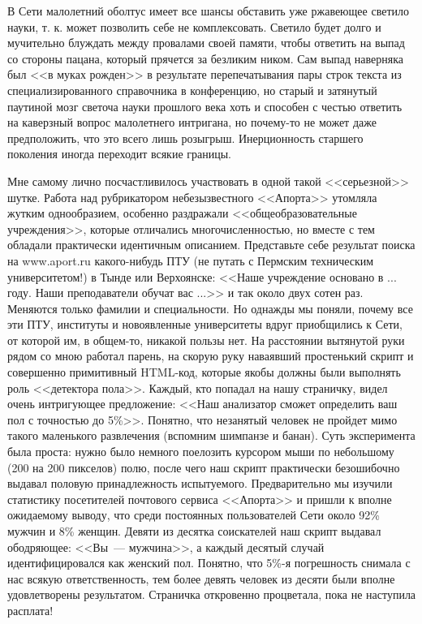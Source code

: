 \documentclass{scrbook}
\newcommand{\flqq}{<<}
\newcommand{\frqq}{>>}
\newcommand{\mdash}{~--- }
\begin{document}
В Сети малолетний оболтус имеет все шансы обставить уже ржавеющее светило науки, т. к. может позволить себе не комплексовать. Светило будет долго и мучительно блуждать между провалами своей памяти, чтобы ответить на выпад со стороны пацана, который прячется за безликим ником. Сам выпад наверняка был {\flqq}в муках рожден{\frqq} в результате перепечатывания пары строк текста из специализированного справочника в конференцию, но старый и затянутый паутиной мозг светоча науки прошлого века хоть и способен с честью ответить на каверзный вопрос малолетнего интригана, но почему-то не может даже предположить, что это всего лишь розыгрыш. Инерционность старшего поколения иногда переходит всякие границы.

Мне самому лично посчастливилось участвовать в одной такой {\flqq}серьезной{\frqq} шутке. Работа над рубрикатором небезызвестного {\flqq}Апорта{\frqq} утомляла жутким однообразием, особенно раздражали {\flqq}общеобразовательные учреждения{\frqq}, которые отличались многочисленностью, но вместе с тем обладали практически идентичным описанием. Представьте себе результат поиска на www.aport.ru какого-нибудь ПТУ (не путать с Пермским техническим университетом!) в Тынде или Верхоянске: {\flqq}Наше учреждение основано в ... году. Наши преподаватели обучат вас ...{\frqq} и так около двух сотен раз. Меняются только фамилии и специальности. Но однажды мы поняли, почему все эти ПТУ, институты и новоявленные университеты вдруг приобщились к Сети, от которой им, в общем-то, никакой пользы нет. На расстоянии вытянутой руки рядом со мною работал парень, на скорую руку наваявший простенький скрипт и совершенно примитивный HTML-код, которые якобы должны были выполнять роль {\flqq}детектора пола{\frqq}. Каждый, кто попадал на нашу страничку, видел очень интригующее предложение: {\flqq}Наш анализатор сможет определить ваш пол с точностью до 5\%{\frqq}. Понятно, что незанятый человек не пройдет мимо такого маленького развлечения (вспомним шимпанзе и банан). Суть эксперимента была проста: нужно было немного поелозить курсором мыши по небольшому (200 на 200 пикселов) полю, после чего наш скрипт практически безошибочно выдавал половую принадлежность испытуемого. Предварительно мы изучили статистику посетителей почтового сервиса {\flqq}Апорта{\frqq} и пришли к вполне ожидаемому выводу, что среди постоянных пользователей Сети около 92\% мужчин и 8\% женщин. Девяти из десятка соискателей наш скрипт выдавал ободряющее: {\flqq}Вы{\mdash}мужчина{\frqq}, а каждый десятый случай идентифицировался как женский пол. Понятно, что 5\%-я погрешность снимала с нас всякую ответственность, тем более девять человек из десяти были вполне удовлетворены результатом. Страничка откровенно процветала, пока не наступила расплата!
\end{document}
